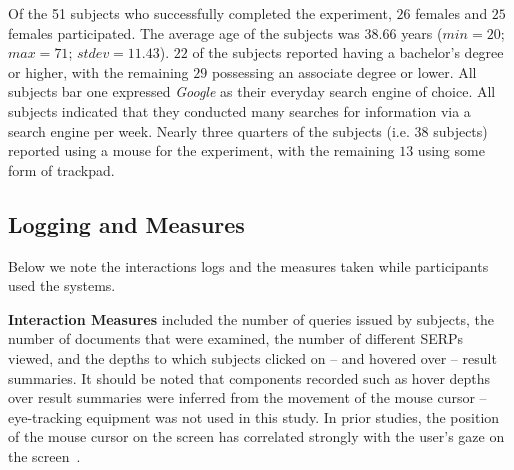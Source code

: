 Of the 51 subjects who successfully completed the experiment, $26$ females and $25$ females participated. The average age of the subjects was $38.66$ years ($min=20$; $max=71$; $stdev=11.43$). $22$ of the subjects reported having a bachelor's degree or higher, with the remaining $29$ possessing an associate degree or lower. All subjects bar one expressed \emph{Google} as their everyday search engine of choice. All subjects indicated that they conducted many searches for information via a search engine per week. Nearly three quarters of the subjects (i.e. 38 subjects) reported using a mouse for the experiment, with the remaining $13$ using some form of trackpad.





\subsection{Logging and Measures}\label{sec:method:behaviours}
Below we note the interactions logs and the measures taken while participants used the systems.

\vspace*{2mm}
\noindent\textbf{Interaction Measures} included the number of queries issued by subjects, the number of documents that were examined, the number of different SERPs viewed, and the depths to which subjects clicked on -- and hovered over -- result summaries. It should be noted that components recorded such as hover depths over result summaries were inferred from the movement of the mouse cursor -- eye-tracking equipment was not used in this study. In prior studies, the position of the mouse cursor on the screen has correlated strongly with the user's gaze on the screen~\cite{chen2001mouse_cursor, smucker2014judging_relevance_movements}.
\vspace*{2mm}

